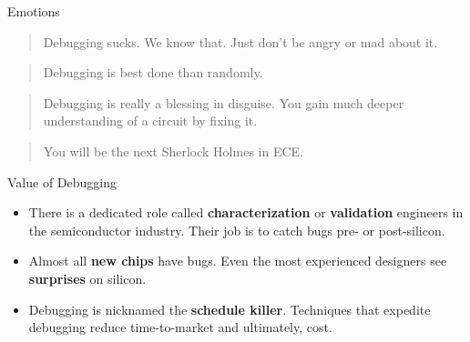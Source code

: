 \begin{alerttextbox}{Emotions}
    \begin{quote}
        Debugging sucks. We know that. Just don't be angry or mad about it.
    \end{quote}

    \begin{quote}
        Debugging is best done \textbf{} than randomly.
    \end{quote}

    \begin{quote}
        Debugging is really a blessing in disguise. You gain much deeper understanding of a circuit by fixing it.
    \end{quote}

    \begin{quote}
        You will be the next Sherlock Holmes in ECE.
    \end{quote}

    
\end{alerttextbox}

\begin{textbox}{Value of Debugging}

\begin{itemize}
    \item There is a dedicated role called \textbf{characterization} or \textbf{validation} engineers in the semiconductor industry.
    Their job is to catch bugs pre- or post-silicon.
    \item Almost all \textbf{new chips} have bugs. Even the most experienced designers see \textbf{surprises} on silicon. 
    \item Debugging is nicknamed the \textbf{schedule killer}. Techniques that expedite debugging reduce
    time-to-market and ultimately, cost.
    
\end{itemize}
    
\end{textbox}







